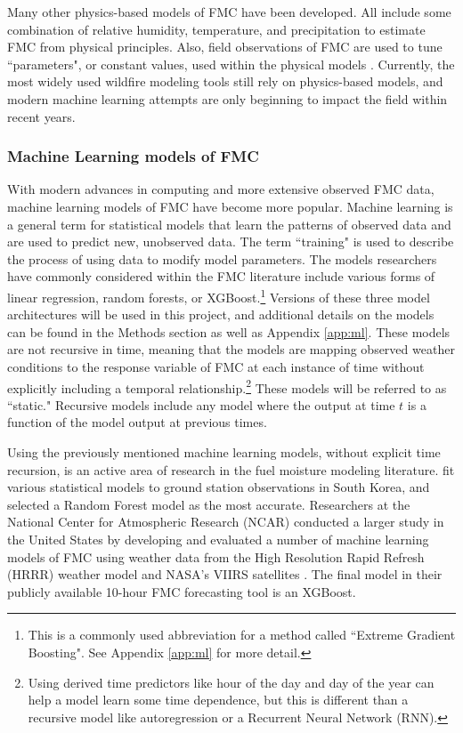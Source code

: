 \documentclass[11pt]{article}%
\begin{document}
Many other physics-based models of FMC have been developed. All include some combination of relative humidity, temperature, and precipitation to estimate FMC from physical principles. Also, field observations of FMC are used to tune ``parameters", or constant values, used within the physical models \citep{Catchpole-1999-EFR,Nelson-2000-PDC, vanderKamp-2017-MFS}.  Currently, the most widely used wildfire modeling tools still rely on physics-based models, and modern machine learning attempts are only beginning to impact the field within recent years.

\subsubsection{Machine Learning models of FMC}
\hfill

With modern advances in computing and more extensive observed FMC data, machine learning models of FMC have become more popular. Machine learning is a general term for statistical models that learn the patterns of observed data and are used to predict new, unobserved data. The term ``training" is used to describe the process of using data to modify model parameters. The models researchers have commonly considered within the FMC literature include various forms of linear regression, random forests, or XGBoost.\footnote{This is a commonly used abbreviation for a method called ``Extreme Gradient Boosting". See Appendix \ref{app:ml} for more detail.} Versions of these three model architectures will be used in this project, and additional details on the models can be found in the Methods section as well as Appendix \ref{app:ml}. These models are not recursive in time, meaning that the models are mapping observed weather conditions to the response variable of FMC at each instance of time without explicitly including a temporal relationship.\footnote{Using derived time predictors like hour of the day and day of the year can help a model learn some time dependence, but this is different than a recursive model like autoregression or a Recurrent Neural Network (RNN).} These models will be referred to as ``static." Recursive models include any model where the output at time $t$ is a function of the model output at previous times.

Using the previously mentioned machine learning models, without explicit time recursion, is an active area of research in the fuel moisture modeling literature. \cite{Lee-2020-EFM} fit various statistical models to ground station observations in South Korea, and selected a Random Forest model as the most accurate. Researchers at the National Center for Atmospheric Research (NCAR) conducted a larger study in the United States by developing and evaluated a number of machine learning models of FMC using weather data from the High Resolution Rapid Refresh (HRRR) weather model and NASA's VIIRS satellites \citep{McCandless-2020-EWS, Schreck-2023-MLV}. The final model in their publicly available 10-hour FMC forecasting tool is an XGBoost. 
\end{document}
